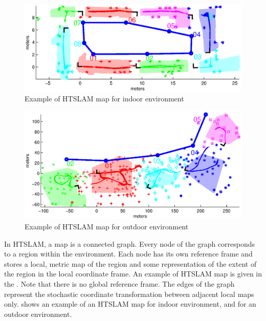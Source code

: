 \begin{figure}
\begin{center}
\includegraphics[width=14cm]{Pics/map_example_indoor}
\end{center}
\caption{Example of HTSLAM map for indoor environment}
\label{fig:htslam_structure_indoor}
\end{figure}


\begin{figure}
\includegraphics[width=14cm]{Pics/map_example_outdoor}
\caption{Example of HTSLAM map for outdoor environment}
\label{fig:htslam_structure_outdoor}
\end{figure}

In HTSLAM, a map is a connected graph. Every node of the graph
corresponds to a region within the environment. Each node has its own
reference frame and stores a local, metric map of the region and some
representation of the extent of the region in the local coordinate
frame. An example of HTSLAM map is given in the
. Note that there is no global reference
frame. The edges of the graph represent the stochastic coordinate
transformation between adjacent local maps
only.  shows an example of an
HTSLAM map for indoor environment, and
 for an outdoor environment.

